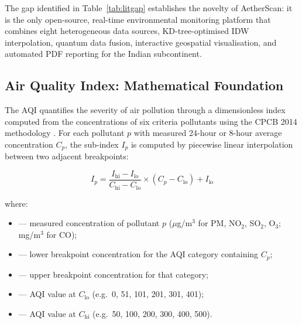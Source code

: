\documentclass[12pt,a4paper]{article}
\begin{document}
The gap identified in Table~\ref{tab:litgap} establishes the novelty of
AetherScan: it is the only open-source, real-time environmental monitoring
platform that combines eight heterogeneous data sources, KD-tree-optimised IDW
interpolation, quantum data fusion, interactive geospatial visualisation,
and automated PDF reporting for the Indian subcontinent.

\clearpage
\label{sec:background}

\subsection{Air Quality Index: Mathematical Foundation}
\label{sec:background:aqi}

The AQI quantifies the severity of air pollution through a dimensionless
index computed from the concentrations of six criteria pollutants using the
CPCB 2014 methodology \cite{cpcb2014}. For each pollutant $p$ with measured
24-hour or 8-hour average concentration $C_p$, the sub-index $I_p$ is computed
by piecewise linear interpolation between two adjacent breakpoints:

\begin{equation}
I_p = \frac{I_{\text{hi}} - I_{\text{lo}}}{C_{\text{hi}} - C_{\text{lo}}}
       \times (C_p - C_{\text{lo}}) + I_{\text{lo}}
\label{eq:aqi}
\end{equation}

\noindent where:
\begin{itemize}[leftmargin=2.5cm,label={}]
\item[$C_p$]          --- measured concentration of pollutant $p$
                          ($\mu$g/m$^3$ for PM, NO$_2$, SO$_2$, O$_3$;
                          mg/m$^3$ for CO);
\item[$C_{\text{lo}}$] --- lower breakpoint concentration for the AQI
                          category containing $C_p$;
\item[$C_{\text{hi}}$] --- upper breakpoint concentration for that category;
\item[$I_{\text{lo}}$] --- AQI value at $C_{\text{lo}}$ (e.g.\ 0, 51, 101,
                          201, 301, 401);
\item[$I_{\text{hi}}$] --- AQI value at $C_{\text{hi}}$ (e.g.\ 50, 100, 200,
                          300, 400, 500).
\end{itemize}
\end{document}

